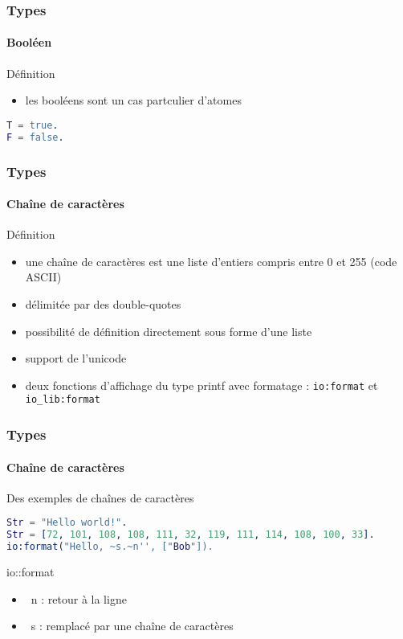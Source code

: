 \begin{frame}[fragile]
  \frametitle{Types}
  \framesubtitle{Booléen}

  \begin{block}{Définition}
    \begin{itemize}
      \item les booléens sont un cas partculier d'atomes
    \end{itemize}
    \begin{lstlisting}[language=erlang]
T = true.
F = false.
    \end{lstlisting}
  \end{block}

\end{frame}

\begin{frame}
  \frametitle{Types}
  \framesubtitle{Chaîne de caractères}

  \begin{block}{Définition}
    \begin{itemize}
      \item une chaîne de caractères est une liste d'entiers compris entre 0
        et 255 (code ASCII)
      \item délimitée par des double-quotes
      \item possibilité de définition directement sous forme d'une liste
      \item support de l'unicode
      \item deux fonctions d'affichage du type printf avec formatage :
        \texttt{io:format} et \texttt{io\_lib:format}
    \end{itemize}
  \end{block}

\end{frame}

\begin{frame}[fragile]
  \frametitle{Types}
  \framesubtitle{Chaîne de caractères}

  \begin{exampleblock}{Des exemples de chaînes de caractères}
    \begin{lstlisting}[language=erlang]
Str = "Hello world!".
Str = [72, 101, 108, 108, 111, 32, 119, 111, 114, 108, 100, 33].
io:format("Hello, ~s.~n'', ["Bob"]).
    \end{lstlisting}
  \end{exampleblock}

  \begin{alertblock}{io::format}
    \begin{itemize}
    \item ~n : retour à la ligne
    \item ~s : remplacé par une chaîne de caractères
    \end{itemize}
  \end{alertblock}

\end{frame}

